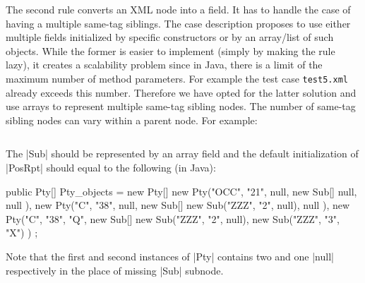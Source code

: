 The second rule converts an XML node into a field.
It has to handle the case of having a multiple same-tag siblings.
The case description proposes to use either multiple fields initialized by specific constructors or by an array/list of such objects.
While the former is easier to implement (simply by making the rule lazy), it creates a scalability problem since in Java, there is a limit of the maximum number of method parameters.
For example the test case \texttt{test5.xml} already exceeds this number.
Therefore we have opted for the latter solution and use arrays to represent multiple same-tag sibling nodes.
The number of same-tag sibling nodes can vary within a parent node.
For example:
%
\inputminted[fontsize=\fontsize{8}{8},linenos,numbersep=5pt,frame=lines,framesep=2mm]{xml}{listings/variable-siblings.xml}
%
The \Scala|Sub| should be represented by an array field and the default initialization of \Scala|PosRpt| should equal to the following (in Java):
\begin{javacode}
public Pty[] Pty_objects = new Pty[] { 
  new Pty("OCC", "21", null, new Sub[] { null, null }),
  new Pty("C", "38", null, new Sub[] { new Sub("ZZZ", "2", null), null }),
  new Pty("C", "38", "Q", new Sub[] { new Sub("ZZZ", "2", null), new Sub("ZZZ", "3", "X") }) 
};
\end{javacode}
Note that the first and second instances of \Scala|Pty| contains two and one \Scala|null| respectively in the place of missing \Scala|Sub| subnode.

